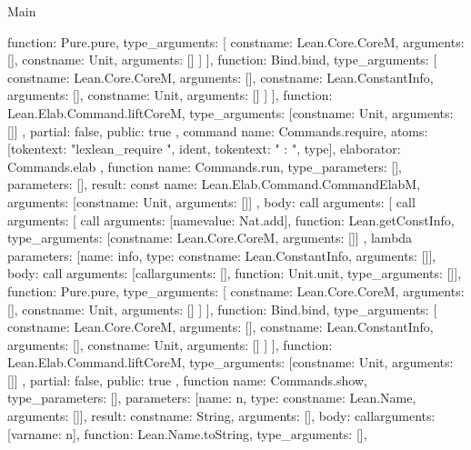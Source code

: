 \begin{lexlean}{Main}
\begin{toolingmodule}
{{{{{{{                    function: Pure.pure,
                    type_arguments: [
                      const{name: Lean.Core.CoreM, arguments: []},
                      const{name: Unit, arguments: []}
                    ]
                  }
                }
              ],
              function: Bind.bind,
              type_arguments: [
                const{name: Lean.Core.CoreM, arguments: []},
                const{name: Lean.ConstantInfo, arguments: []},
                const{name: Unit, arguments: []}
              ]
            }
          ],
          function: Lean.Elab.Command.liftCoreM,
          type_arguments: [const{name: Unit, arguments: []}]
        }
      },
      partial: false,
      public: true
    },
    command{
      name: Commands.require,
      atoms: [token{text: "lexlean_require "}, ident{}, token{text: " : "}, type{}],
      elaborator: Commands.elab
    },
    function{
      name: Commands.run,
      type_parameters: [],
      parameters: [],
      result: const{
        name: Lean.Elab.Command.CommandElabM,
        arguments: [const{name: Unit, arguments: []}]
      },
      body: call{
        arguments: [
          call{
            arguments: [
              call{
                arguments: [name{value: Nat.add}],
                function: Lean.getConstInfo,
                type_arguments: [const{name: Lean.Core.CoreM, arguments: []}]
              },
              lambda{
                parameters: [{name: info, type: const{name: Lean.ConstantInfo, arguments: []}}],
                body: call{
                  arguments: [call{arguments: [], function: Unit.unit, type_arguments: []}],
                  function: Pure.pure,
                  type_arguments: [
                    const{name: Lean.Core.CoreM, arguments: []},
                    const{name: Unit, arguments: []}
                  ]
                }
              }
            ],
            function: Bind.bind,
            type_arguments: [
              const{name: Lean.Core.CoreM, arguments: []},
              const{name: Lean.ConstantInfo, arguments: []},
              const{name: Unit, arguments: []}
            ]
          }
        ],
        function: Lean.Elab.Command.liftCoreM,
        type_arguments: [const{name: Unit, arguments: []}]
      },
      partial: false,
      public: true
    },
    function{
      name: Commands.show,
      type_parameters: [],
      parameters: [{name: n, type: const{name: Lean.Name, arguments: []}}],
      result: const{name: String, arguments: []},
      body: call{arguments: [var{name: n}], function: Lean.Name.toString, type_arguments: []},
}}
\end{toolingmodule}
\end{lexlean}
